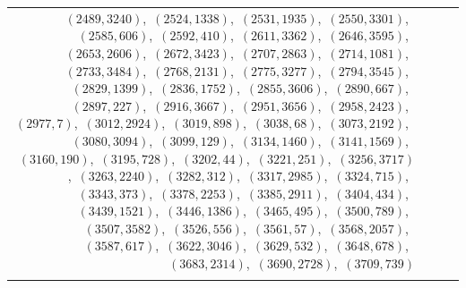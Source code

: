 \documentclass[11pt]{article}
\begin{document}
\begin{longtable}{@{}rrl>{\raggedright\arraybackslash}p{}@{}}
$(2489,3240)$,\allowbreak\ $(2524,1338)$,\allowbreak\ $(2531,1935)$,\allowbreak\ $(2550,3301)$,\allowbreak\ $(2585,606)$,\allowbreak\ $(2592,410)$,\allowbreak\ $(2611,3362)$,\allowbreak\ $(2646,3595)$,\allowbreak\ $(2653,2606)$,\allowbreak\ $(2672,3423)$,\allowbreak\ $(2707,2863)$,\allowbreak\ $(2714,1081)$,\allowbreak\ $(2733,3484)$,\allowbreak\ $(2768,2131)$,\allowbreak\ $(2775,3277)$,\allowbreak\ $(2794,3545)$,\allowbreak\ $(2829,1399)$,\allowbreak\ $(2836,1752)$,\allowbreak\ $(2855,3606)$,\allowbreak\ $(2890,667)$,\allowbreak\ $(2897,227)$,\allowbreak\ $(2916,3667)$,\allowbreak\ $(2951,3656)$,\allowbreak\ $(2958,2423)$,\allowbreak\ $(2977,7)$,\allowbreak\ $(3012,2924)$,\allowbreak\ $(3019,898)$,\allowbreak\ $(3038,68)$,\allowbreak\ $(3073,2192)$,\allowbreak\ $(3080,3094)$,\allowbreak\ $(3099,129)$,\allowbreak\ $(3134,1460)$,\allowbreak\ $(3141,1569)$,\allowbreak\ $(3160,190)$,\allowbreak\ $(3195,728)$,\allowbreak\ $(3202,44)$,\allowbreak\ $(3221,251)$,\allowbreak\ $(3256,3717)$,\allowbreak\ $(3263,2240)$,\allowbreak\ $(3282,312)$,\allowbreak\ $(3317,2985)$,\allowbreak\ $(3324,715)$,\allowbreak\ $(3343,373)$,\allowbreak\ $(3378,2253)$,\allowbreak\ $(3385,2911)$,\allowbreak\ $(3404,434)$,\allowbreak\ $(3439,1521)$,\allowbreak\ $(3446,1386)$,\allowbreak\ $(3465,495)$,\allowbreak\ $(3500,789)$,\allowbreak\ $(3507,3582)$,\allowbreak\ $(3526,556)$,\allowbreak\ $(3561,57)$,\allowbreak\ $(3568,2057)$,\allowbreak\ $(3587,617)$,\allowbreak\ $(3622,3046)$,\allowbreak\ $(3629,532)$,\allowbreak\ $(3648,678)$,\allowbreak\ $(3683,2314)$,\allowbreak\ $(3690,2728)$,\allowbreak\ $(3709,739)$\\
\addlinespace[3pt]

\end{longtable}
\end{document}
